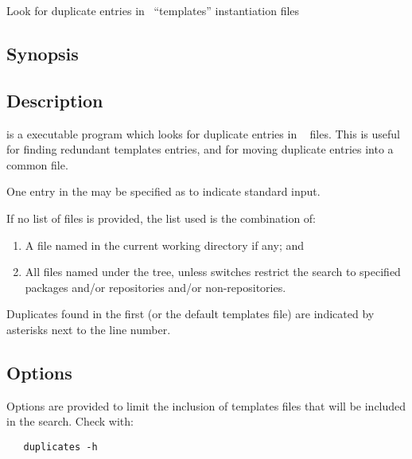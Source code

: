 Look for duplicate entries in \aipspp\ ``templates'' instantiation files

\subsection*{Synopsis}

\begin{synopsis}
\end{synopsis}

\subsection*{Description}

 is a  executable program which looks for duplicate
entries in \aipspp\  files. This is useful for finding
redundant templates entries, and for moving duplicate entries into a common
 file.

One entry in the  may be specified as \code{-} to
indicate standard input.

If no list of files is provided, the list used is the combination of:
\begin{enumerate}
	\item A file named  in the current working directory
              if any; and
	\item All files named  under the
	      tree, unless switches restrict the search to
	      specified packages and/or repositories and/or non-repositories.
\end{enumerate}

Duplicates found in the first (or the default templates file) are indicated
by asterisks next to the line number.

\subsection*{Options}

Options are provided to limit the inclusion of templates files that will be
included in the search. Check with:

\begin{verbatim}
   duplicates -h
\end{verbatim}

